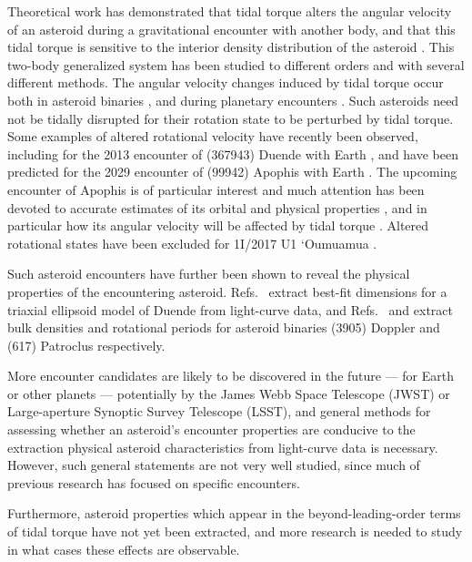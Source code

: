 \documentclass[fleqn,usenatbib]{mnras}
\begin{document}
Theoretical work has demonstrated that tidal torque alters the angular velocity of an asteroid during a gravitational encounter with another body, and that this tidal torque is sensitive to the interior density distribution of the asteroid \cite{paul88, SCHEERES2000106, ashenberg07, BOUE2009750, HouMar2017}. This two-body generalized system has been studied to different orders and with several different methods. The angular velocity changes induced by tidal torque occur both in asteroid binaries \cite{Naidu_2015, Makarov2022ChaosOO}, and during planetary encounters \cite{RICHARDSON199847, scheeres2004evolution}. Such asteroids need not be tidally disrupted for their rotation state to be perturbed by tidal torque. Some examples of altered rotational velocity have recently been observed, including for the 2013 encounter of (367943) Duende with Earth \cite{MOSKOVITZ2020113519, benson2020spin}, and have been predicted for the 2029 encounter of (99942) Apophis with Earth \cite{SCHEERES2005281, DEMARTINI201993}. The upcoming encounter of Apophis is of particular interest and much attention has been devoted to accurate estimates of its orbital and physical properties \cite{yu2014numerical, hirabayashi2021finite,valvano2022apophis, Lee2022Apophis}, and in particular how its angular velocity will be affected by tidal torque \cite{souchay2014rotational, souchay2018changes}. Altered rotational states have been excluded for 1I/2017 U1 `Oumuamua \cite{KWIECINSKI2018170}. 


Such asteroid encounters have further been shown to reveal the physical properties of the encountering asteroid. Refs.~\cite{MOSKOVITZ2020113519, benson2020spin} extract best-fit dimensions for a triaxial ellipsoid model of Duende from light-curve data, and Refs.~\cite{DESCAMPS2020113726} and \cite{BERTHIER2020113990} extract bulk densities and rotational periods for asteroid binaries (3905) Doppler and (617) Patroclus respectively.

More encounter candidates are likely to be discovered in the future --- for Earth or other planets --- potentially by the James Webb Space Telescope (JWST) or Large-aperture Synoptic Survey Telescope (LSST), and general methods for assessing whether an asteroid's encounter properties are conducive to the extraction physical asteroid characteristics from light-curve data is necessary. However, such general statements are not very well studied, since much of previous research has focused on specific encounters.

Furthermore, asteroid properties which appear in the beyond-leading-order terms of tidal torque have not yet been extracted, and more research is needed to study in what cases these effects are observable.
\end{document}
